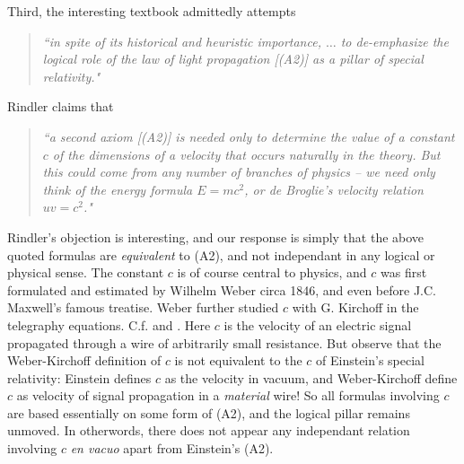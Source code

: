 \documentclass[12pt]{amsart}
\begin{document}
Third, the interesting textbook \cite[pp.8-10, 21-22]{rindler} admittedly attempts 
\begin{quote}
\emph{``in spite of its historical and heuristic importance, $\ldots$ to de-emphasize the logical role of the law of light propagation [(A2)] as a pillar of special relativity."}
\end{quote}
Rindler claims that
\begin{quote}
\emph{``a second axiom [(A2)] is needed \emph{only} to determine the value of a constant $c$ of the dimensions of a velocity that occurs naturally in the theory. But this could come from any number of branches of physics -- we need only think of the energy formula $E=mc^2$, or de Broglie's velocity relation $u v =c^2$." }
\end{quote}
Rindler's objection is interesting, and our response is simply that the above quoted formulas are \emph{equivalent} to (A2), and not independant in any logical or physical sense. The constant $c$ is of course central to physics, and $c$ was first formulated and estimated by Wilhelm Weber circa 1846, and even before J.C. Maxwell's famous treatise. Weber further studied $c$ with G. Kirchoff in the telegraphy equations. C.f. \cite{assis1999meaning} and \cite{awk}. Here $c$ is the velocity of an electric signal propagated through a wire of arbitrarily small resistance. But observe that the Weber-Kirchoff definition of $c$ is not equivalent to the $c$ of Einstein's special relativity: Einstein defines $c$ as the velocity in vacuum, and Weber-Kirchoff define $c$ as velocity of signal propagation in a \emph{material} wire! So all formulas involving $c$ are based essentially on some form of (A2), and the logical pillar remains unmoved. In otherwords, there does not appear any independant relation involving $c$ \emph{en vacuo} apart from Einstein's (A2). 

\end{document}
